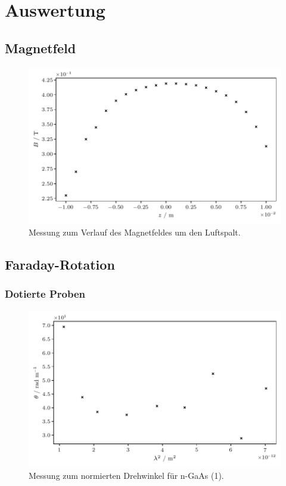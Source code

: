 \section{Auswertung}
\label{sec:auswertung}

\cite{matplotlib} \cite{numpy}

\subsection{Magnetfeld}

\begin{figure}[H]
    \centering
    \includegraphics{build/field.pdf}
    \caption{Messung zum Verlauf des Magnetfeldes um den Luftspalt.}
    \label{fig:feld}
\end{figure}

\subsection{Faraday-Rotation}

\subsubsection{Dotierte Proben}

\begin{figure}[H]
    \centering
    \includegraphics{build/doped-1.pdf}
    \caption{Messung zum normierten Drehwinkel für n-GaAs (1).}
    \label{fig:dotiert-1}
\end{figure}

